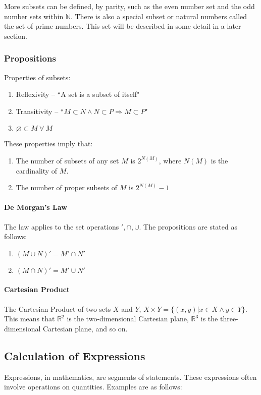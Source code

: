 More subsets can be defined, by parity, such as the even number set and the odd number sets within $\mathbb{N}$. There is also a special subset or natural numbers called the set of prime numbers. This set will be described in some detail in a later section.

\subsubsection{Propositions}
Properties of subsets:
\begin{enumerate}
    \item Reflexivity -- ``A set is a subset of itself"
    \item Transitivity -- ``$M \subset N \land N \subset P \Longrightarrow M \subset P$"
    \item $\varnothing \subset M\ \forall\ M$
\end{enumerate}

These properties imply that:
\begin{enumerate}
    \item The number of subsets of any set $M$ is $2^{N(M)}$, where $N(M)$ is the cardinality of $M$.
    \item The number of proper subsets of $M$ is $2^{N(M)}-1$
\end{enumerate}

\paragraph{De Morgan's Law}
The law applies to the set operations $', \cap, \cup$.
The propositions are stated as follows:

\begin{enumerate}
    \item $(M \cup N)' = M' \cap N'$
    \item $(M \cap N)' = M' \cup N'$
\end{enumerate}

\paragraph{Cartesian Product}
The Cartesian Product of two sets $X$ and $Y$, $X \times Y = \{(x, y) | x \in X \land y \in Y\}$. This means that $\mathbb{R}^2$ is the two-dimensional Cartesian plane, $\mathbb{R}^3$ is the three-dimensional Cartesian plane, and so on.

\subsection{Calculation of Expressions}
Expressions, in mathematics, are segments of statements.
These expressions often involve operations on quantities.
Examples are as follows:

